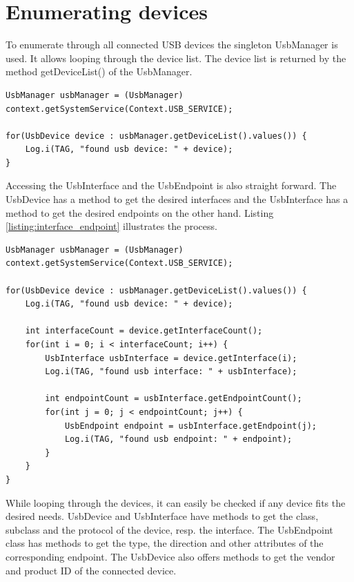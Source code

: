 \section{Enumerating devices}

To enumerate through all connected USB devices the singleton UsbManager is used. It allows looping through the device list. The device list is returned by the method getDeviceList() of the UsbManager.

\begin{lstlisting}[caption=Enumerating connected USB devices, label=listing:enumerate]
UsbManager usbManager = (UsbManager) context.getSystemService(Context.USB_SERVICE);
		
for(UsbDevice device : usbManager.getDeviceList().values()) {
	Log.i(TAG, "found usb device: " + device);
}
\end{lstlisting}

Accessing the UsbInterface and the UsbEndpoint is also straight forward. The UsbDevice has a method to get the desired interfaces and the UsbInterface has a method to get the desired endpoints on the other hand. Listing \ref{listing:interface_endpoint} illustrates the process.

\begin{lstlisting}[caption=Accessing UsbInterface and UsbEndpoint, label=listing:interface_endpoint]
UsbManager usbManager = (UsbManager) context.getSystemService(Context.USB_SERVICE);
		
for(UsbDevice device : usbManager.getDeviceList().values()) {
	Log.i(TAG, "found usb device: " + device);
	
	int interfaceCount = device.getInterfaceCount();
	for(int i = 0; i < interfaceCount; i++) {
		UsbInterface usbInterface = device.getInterface(i);
		Log.i(TAG, "found usb interface: " + usbInterface);
		
		int endpointCount = usbInterface.getEndpointCount();
		for(int j = 0; j < endpointCount; j++) {
			UsbEndpoint endpoint = usbInterface.getEndpoint(j);
			Log.i(TAG, "found usb endpoint: " + endpoint);
		}
	}
}
\end{lstlisting}

While looping through the devices, it can easily be checked if any device fits the desired needs. UsbDevice and UsbInterface have methods to get the class, subclass and the protocol of the device, resp. the interface. The UsbEndpoint class has methods to get the type, the direction and other attributes of the corresponding endpoint. The UsbDevice also offers methods to get the vendor and product ID of the connected device.

